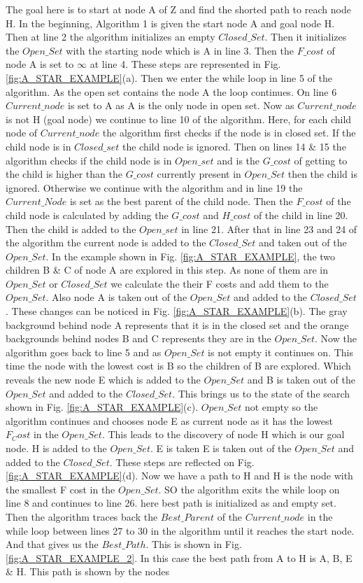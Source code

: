The goal here is to start at node A of Z and find the shorted path to reach node H. In the beginning, Algorithm 1 is given the start node A and goal node H. Then at line 2 the algorithm initializes an empty $Closed\_Set$. Then it initializes the $Open\_Set$ with the starting node which is A in line 3. Then the $F\_cost$ of node A is set to $\infty$ at line 4. These steps are represented in Fig.\ref{fig:A_STAR_EXAMPLE}(a).  Then we enter the while loop in line 5 of the algorithm. As the open set contains the node A the loop continues. On line 6 $Current\_node$ is set to A as A is the only node in open set. Now as $Current\_node$ is not H (goal node) we continue to line 10 of the algorithm. Here, for each child node of $Current\_node$ the algorithm first checks if the node is in closed set. If the child node is in $Closed\_set$ the child node is ignored. Then on lines 14 \& 15 the algorithm checks if the child node is in $Open\_set$ and is the $G\_cost$ of getting to the child is higher than the $G\_cost$ currently present in $Open\_Set$ then the child is ignored. Otherwise we continue with the algorithm and in line 19 the $Current\_Node$ is set as the best parent of the child node. Then the $F\_cost$ of the child node is calculated by adding the $G\_cost$ and $H\_cost$ of the child in line 20. Then the child is added to the $Open\_set$ in line 21. After that in line 23 and 24 of the algorithm the current node is added to the $Closed\_Set$ and taken out of the $Open\_Set$. In the example shown in Fig. \ref{fig:A_STAR_EXAMPLE}, the two children B \& C of node A are explored in this step. As none of them are in $Open\_Set$ or $Closed\_Set$ we calculate the their F costs and add them to the $Open\_Set$. Also node A is taken out of the $Open\_Set$ and added to the $Closed\_Set$. These changes can be noticed in Fig. \ref{fig:A_STAR_EXAMPLE}(b). The gray background behind node A represents that it is in the closed set and the orange backgrounds behind nodes B and C represents they are in the $Open\_Set$. Now the algorithm goes back to line 5 and as $Open\_Set$ is not empty it continues on. This time the node with the lowest cost is B so the children of B are explored. Which reveals the new node E which is added to the $Open\_Set$ and B is taken out of the $Open\_Set$ and added to the $Closed\_Set$. This brings us to the state of the search shown in Fig. \ref{fig:A_STAR_EXAMPLE}(c). $Open\_Set$ not empty so the algorithm continues and chooses node E as current node as it has the lowest $F_Cost$ in the $Open\_Set$. This leads to the discovery of node H which is our goal node. H is added to the $Open\_Set$. E is taken E is taken out of the $Open\_Set$ and added to the $Closed\_Set$. These steps are reflected on Fig. \ref{fig:A_STAR_EXAMPLE}(d). Now we have a path to H and H is the node with the smallest F cost in the $Open\_Set$. SO the algorithm exits the while loop on line 8 and continues to line 26. here best path is initialized as and empty set. Then the algorithm traces back the $Best\_Parent$ of the $Current\_node$ in the while loop between lines 27 to 30 in the algorithm until it reaches the start node. And that gives us the $Best\_Path$. This is shown in Fig. \ref{fig:A_STAR_EXAMPLE_2}. In this case the best path from A to H is A, B, E \& H. This path is shown by the nodes 